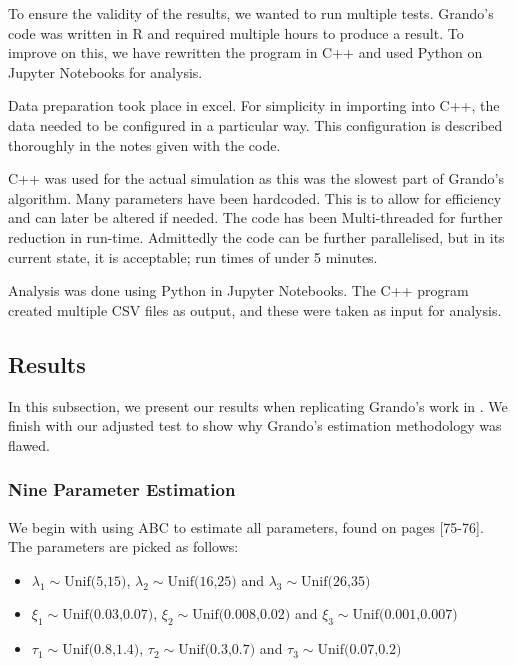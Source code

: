     To ensure the validity of the results, we wanted to run multiple tests. Grando's code was written in R and required multiple hours to produce a result. To improve on this, we have rewritten the program in C++ and used Python on Jupyter Notebooks for analysis.

    Data preparation took place in excel. For simplicity in importing into C++, the data needed to be configured in a particular way. This configuration is described thoroughly in the notes given with the code. 

    C++ was used for the actual simulation as this was the slowest part of Grando's algorithm. Many parameters have been hardcoded. This is to allow for efficiency and can later be altered if needed. The code has been Multi-threaded for further reduction in run-time. Admittedly the code can be further parallelised, but in its current state, it is acceptable; run times of under 5 minutes. 

    Analysis was done using Python in Jupyter Notebooks. The C++ program created multiple CSV files as output, and these were taken as input for analysis. 

    \subsection{Results}
    \label{Replicating_Existing_Rainfall_Model:Replicating_Grando:Results}
    In this subsection, we present our results when replicating Grando's work in \cite{Grando2019}. We finish with our adjusted test to show why Grando's estimation methodology was flawed.

        \subsubsection{Nine Parameter Estimation}
        \label{Replicating_Existing_Rainfall_Model:Replicating_Grando:Results:Nine_Parameter_Estimation}

        We begin with using ABC to estimate all parameters, found on pages \cite{Grando2019}[75-76]. The parameters are picked as follows:

        \begin{itemize}
            \item $\lambda_1 \sim \text{Unif(5,15)}$, $\lambda_2 \sim \text{Unif(16,25)}$ and $\lambda_3 \sim \text{Unif(26,35)}$
            \item $\xi_1 \sim \text{Unif(0.03,0.07)}$, $\xi_2 \sim \text{Unif(0.008,0.02)}$ and $\xi_3 \sim \text{Unif(0.001,0.007)}$
            \item $\tau_1 \sim \text{Unif(0.8,1.4)}$, $\tau_2 \sim \text{Unif(0.3,0.7)}$ and $\tau_3 \sim \text{Unif(0.07,0.2)}$
        \end{itemize}

